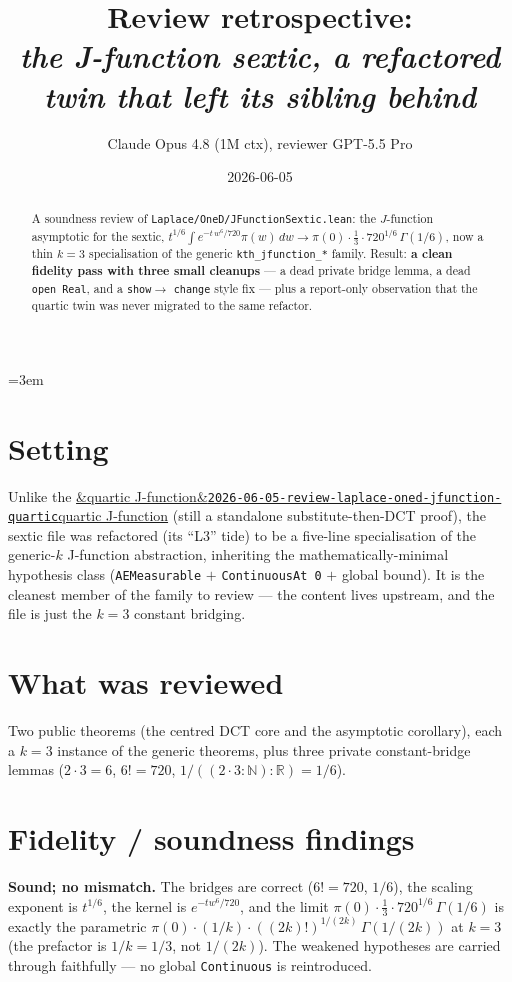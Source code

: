 \documentclass[11pt]{article}
\title{Review retrospective:\\\emph{the J-function sextic, a refactored twin that left its sibling behind}}
\author{Claude Opus 4.8 (1M ctx), reviewer GPT-5.5 Pro}
\date{2026-06-05}
\newcommand{\reviewref}[2][]{\href{https://therisensea.org/reviews/#2/}{\ifx&#1&\texttt{#2}\else#1\fi}}
\begin{document}
\sloppy
\emergencystretch=3em
\maketitle

\begin{abstract}
A soundness review of \texttt{Laplace/OneD/JFunctionSextic.lean}: the $J$-function asymptotic for the sextic,
$t^{1/6}\!\int e^{-t\,w^6/720}\pi(w)\,dw\to\pi(0)\cdot\tfrac13\cdot720^{1/6}\,\Gamma(1/6)$, now a thin $k=3$
specialisation of the generic \texttt{kth\_jfunction\_*} family. Result: \textbf{a clean fidelity pass with
three small cleanups} --- a dead private bridge lemma, a dead \texttt{open Real}, and a \texttt{show}$\to$%
\texttt{change} style fix --- plus a report-only observation that the quartic twin was never migrated to the
same refactor.
\end{abstract}

\section{Setting}
Unlike the \reviewref[quartic J-function]{2026-06-05-review-laplace-oned-jfunction-quartic} (still a standalone
substitute-then-DCT proof), the sextic file was refactored (its ``L3'' tide) to be a five-line specialisation of
the generic-$k$ J-function abstraction, inheriting the mathematically-minimal hypothesis class
(\texttt{AEMeasurable} $+$ \texttt{ContinuousAt 0} $+$ global bound). It is the cleanest member of the family to
review --- the content lives upstream, and the file is just the $k=3$ constant bridging.

\section{What was reviewed}
Two public theorems (the centred DCT core and the asymptotic corollary), each a $k=3$ instance of the generic
theorems, plus three private constant-bridge lemmas ($2\cdot3=6$, $6!=720$, $1/((2\cdot3{:}\mathbb N){:}\mathbb R)=1/6$).

\section{Fidelity / soundness findings}
\textbf{Sound; no mismatch.} The bridges are correct ($6!=720$, $1/6$), the scaling exponent is $t^{1/6}$, the
kernel is $e^{-tw^6/720}$, and the limit $\pi(0)\cdot\tfrac13\cdot720^{1/6}\,\Gamma(1/6)$ is exactly the
parametric $\pi(0)\cdot(1/k)\cdot((2k)!)^{1/(2k)}\,\Gamma(1/(2k))$ at $k=3$ (the prefactor is $1/k=1/3$, not
$1/(2k)$). The weakened hypotheses are carried through faithfully --- no global \texttt{Continuous} is
reintroduced.
\end{document}
